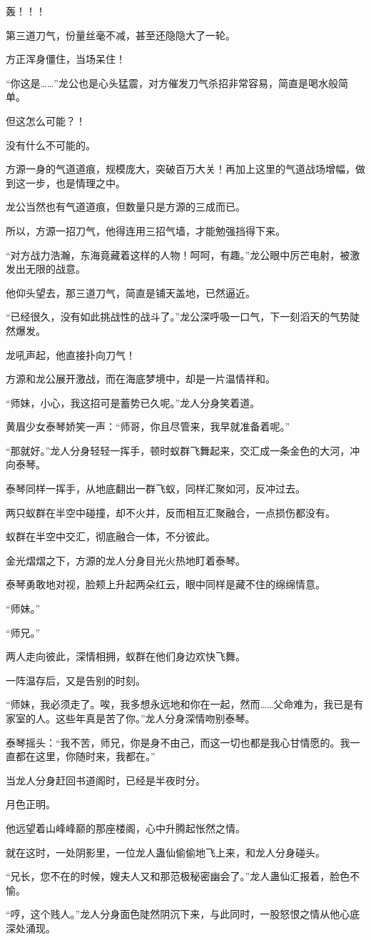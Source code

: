 \begin{this_body}
轰！！！

第三道刀气，份量丝毫不减，甚至还隐隐大了一轮。

方正浑身僵住，当场呆住！

“你这是……”龙公也是心头猛震，对方催发刀气杀招非常容易，简直是喝水般简单。

但这怎么可能？！

没有什么不可能的。

方源一身的气道道痕，规模庞大，突破百万大关！再加上这里的气道战场增幅，做到这一步，也是情理之中。

龙公当然也有气道道痕，但数量只是方源的三成而已。

所以，方源一招刀气，他得连用三招气墙，才能勉强挡得下来。

“对方战力浩瀚，东海竟藏着这样的人物！呵呵，有趣。”龙公眼中厉芒电射，被激发出无限的战意。

他仰头望去，那三道刀气，简直是铺天盖地，已然逼近。

“已经很久，没有如此挑战性的战斗了。”龙公深呼吸一口气，下一刻滔天的气势陡然爆发。

龙吼声起，他直接扑向刀气！

方源和龙公展开激战，而在海底梦境中，却是一片温情祥和。

“师妹，小心，我这招可是蓄势已久呢。”龙人分身笑着道。

黄眉少女泰琴娇笑一声：“师哥，你且尽管来，我早就准备着呢。”

“那就好。”龙人分身轻轻一挥手，顿时蚁群飞舞起来，交汇成一条金色的大河，冲向泰琴。

泰琴同样一挥手，从地底翻出一群飞蚁，同样汇聚如河，反冲过去。

两只蚁群在半空中碰撞，却不火并，反而相互汇聚融合，一点损伤都没有。

蚁群在半空中交汇，彻底融合一体，不分彼此。

金光熠熠之下，方源的龙人分身目光火热地盯着泰琴。

泰琴勇敢地对视，脸颊上升起两朵红云，眼中同样是藏不住的绵绵情意。

“师妹。”

“师兄。”

两人走向彼此，深情相拥，蚁群在他们身边欢快飞舞。

一阵温存后，又是告别的时刻。

“师妹，我必须走了。唉，我多想永远地和你在一起，然而……父命难为，我已是有家室的人。这些年真是苦了你。”龙人分身深情吻别泰琴。

泰琴摇头：“我不苦，师兄，你是身不由己，而这一切也都是我心甘情愿的。我一直都在这里，你随时来，我都在。”

当龙人分身赶回书道阁时，已经是半夜时分。

月色正明。

他远望着山峰峰巅的那座楼阁，心中升腾起怅然之情。

就在这时，一处阴影里，一位龙人蛊仙偷偷地飞上来，和龙人分身碰头。

“兄长，您不在的时候，嫂夫人又和那范极秘密幽会了。”龙人蛊仙汇报着，脸色不愉。

“哼，这个贱人。”龙人分身面色陡然阴沉下来，与此同时，一股怒恨之情从他心底深处涌现。

\end{this_body}


